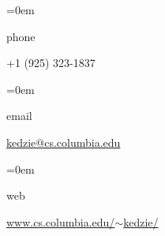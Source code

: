 \documentclass{scrartcl}
\newcommand{\NewEntry}[2]{\noindent\hangindent=0em\hangafter=0 \parbox{4em}{\small #1} #2 
\vspace{0.35em}} %
\begin{document}
\thispagestyle{empty} %


\begin{cv}{}\vspace{0.5em} %

\noindent{}\vspace{0.5em} 

\NewEntry{phone}{+1 (925) 323-1837}

\NewEntry{email}{\href{mailto:kedzie@cs.columbia.edu}{kedzie@cs.columbia.edu}}

\NewEntry{web}{\href{http://www.cs.columbia.edu/~kedzie/}{www.cs.columbia.edu/$\sim$kedzie/}}


\end{cv}
\end{document}

